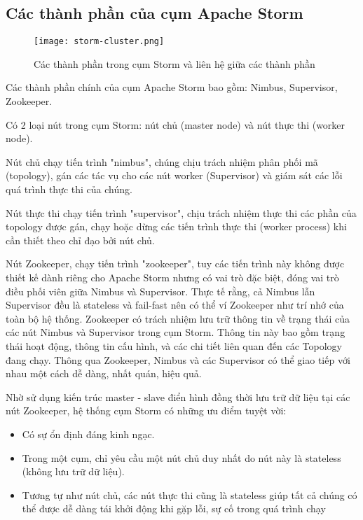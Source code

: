\subsection{Các thành phần của cụm Apache Storm}

\begin{figure}[htbp]
    \begin{center}
        \texttt{[image: storm-cluster.png]}
        \caption{Các thành phần trong cụm Storm và liên hệ giữa các thành phần}
    \end{center}
\end{figure}

Các thành phần chính của cụm Apache Storm bao gồm: Nimbus, Supervisor, Zookeeper.

Có 2 loại nút trong cụm Storm: nút chủ (master node) và nút thực thi (worker node).

Nút chủ chạy tiến trình "nimbus", chúng chịu trách nhiệm phân phối mã (topology), gán các tác vụ cho các nút worker (Supervisor) và giám sát các lỗi quá trình thực thi của chúng.

Nút thực thi chạy tiến trình "supervisor", chịu trách nhiệm thực thi các phần của topology được gán, chạy hoặc dừng các tiến trình thực thi (worker process) khi cần thiết theo chỉ đạo bởi nút chủ.

Nút Zookeeper, chạy tiến trình "zookeeper", tuy các tiến trình này không được thiết kế dành riêng cho Apache Storm nhưng có vai trò đặc biệt, đóng vai trò điều phối viên giữa Nimbus và Supervisor. Thực tế rằng, cả Nimbus lẫn Supervisor đều là stateless và fail-fast nên có thể ví Zookeeper như trí nhớ của toàn bộ hệ thống. Zookeeper có trách nhiệm lưu trữ thông tin về trạng thái của các nút Nimbus và Supervisor trong cụm Storm. Thông tin này bao gồm trạng thái hoạt động, thông tin cấu hình, và các chi tiết liên quan đến các Topology đang chạy. Thông qua Zookeeper, Nimbus và các Supervisor có thể giao tiếp với nhau một cách dễ dàng, nhất quán, hiệu quả.

Nhờ sử dụng kiến trúc master - slave điển hình đồng thời lưu trữ dữ liệu tại các nút Zookeeper, hệ thống cụm Storm có những ưu điểm tuyệt vời:

\begin{itemize}
    \item Có sự ổn định đáng kinh ngạc.
    \item Trong một cụm, chỉ yêu cầu một nút chủ duy nhất do nút này là stateless (không lưu trữ dữ liệu).
    \item Tương tự như nút chủ, các nút thực thi cũng là stateless giúp tất cả chúng có thể được dễ dàng tái khởi động khi gặp lỗi, sự cố trong quá trình chạy
\end{itemize}

